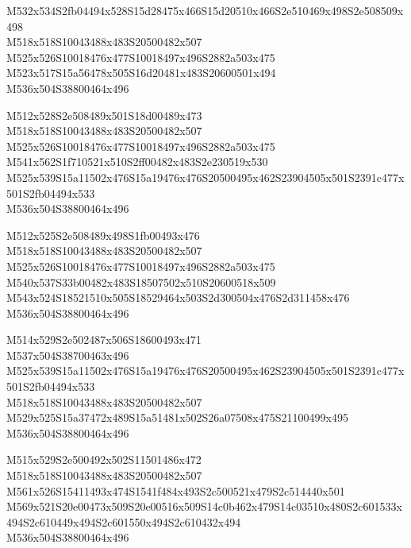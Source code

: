 \documentclass{article}
\begin{document}
\begin{multicols}{5}
\begin{center}

M532x534S2fb04494x528S15d28475x466S15d20510x466S2e510469x498S2e508509x498 %
\\M518x518S10043488x483S20500482x507 %
\\M525x526S10018476x477S10018497x496S2882a503x475 %
\\M523x517S15a56478x505S16d20481x483S20600501x494 %
\\M536x504S38800464x496 %

M512x528S2e508489x501S18d00489x473 %
\\M518x518S10043488x483S20500482x507 %
\\M525x526S10018476x477S10018497x496S2882a503x475 %
\\M541x562S1f710521x510S2ff00482x483S2e230519x530 %
\\M525x539S15a11502x476S15a19476x476S20500495x462S23904505x501S2391c477x501S2fb04494x533 %
\\M536x504S38800464x496 %

M512x525S2e508489x498S1fb00493x476 %
\\M518x518S10043488x483S20500482x507 %
\\M525x526S10018476x477S10018497x496S2882a503x475 %
\\M540x537S33b00482x483S18507502x510S20600518x509 %
\\M543x524S18521510x505S18529464x503S2d300504x476S2d311458x476 %
\\M536x504S38800464x496 %

M514x529S2e502487x506S18600493x471 %
\\M537x504S38700463x496 %
\\M525x539S15a11502x476S15a19476x476S20500495x462S23904505x501S2391c477x501S2fb04494x533 %
\\M518x518S10043488x483S20500482x507 %
\\M529x525S15a37472x489S15a51481x502S26a07508x475S21100499x495 %
\\M536x504S38800464x496 %

M515x529S2e500492x502S11501486x472 %
\\M518x518S10043488x483S20500482x507 %
\\M561x526S15411493x474S1541f484x493S2c500521x479S2c514440x501 %
\\M569x521S20e00473x509S20e00516x509S14c0b462x479S14c03510x480S2c601533x494S2c610449x494S2c601550x494S2c610432x494 %
\\M536x504S38800464x496 %


\end{center}
\end{multicols}
\end{document}
